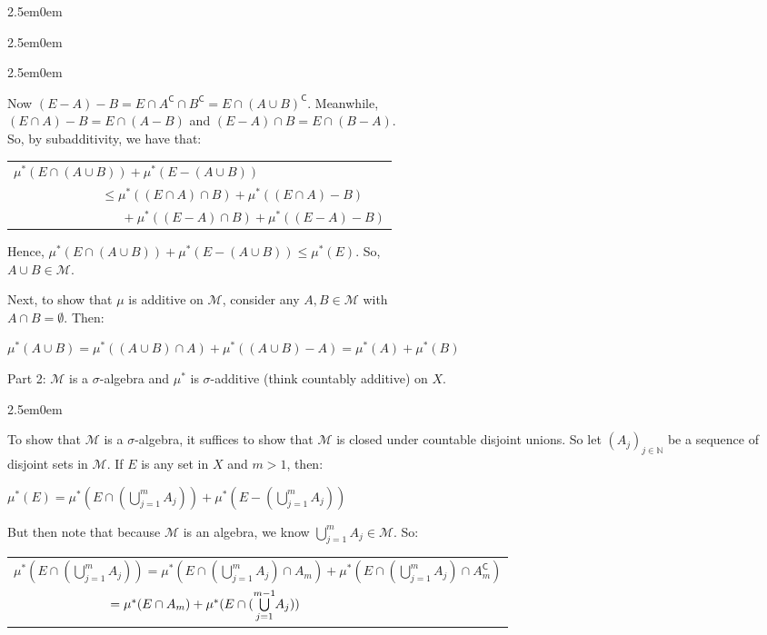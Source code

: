 \documentclass{book}
\newcommand{\hFour}{%
   \color{Cyan!80!black}
   \fontsize{12}{14}\selectfont%
}
\newenvironment{myIndent}{%
   \begin{adjustwidth}{2.5em}{0em}%
}{%
   \end{adjustwidth}%
}
\newcommand{\comp}{\mathsf{C}}
\newcommand{\retTwo}{\hfill\bigbreak}
\begin{document}
\begin{myIndent}
\begin{myIndent}
\begin{myIndent}
\begin{itemize}
            Now $(E - A) - B = E \cap A^\comp \cap B^\comp = E \cap (A \cup B)^\comp$. Meanwhile,\\ $(E \cap A) - B = E \cap (A - B)$ and $(E - A) \cap B = E \cap (B - A)$.\\ So, by subadditivity, we have that:

            {\centering\begin{tabular}{l}
               $\mu^*(E \cap (A \cup B)) + \mu^*(E - (A \cup B))$\\
               $\phantom{aaaaaaaaaaaaa} \leq \mu^*((E \cap A) \cap B) + \mu^*((E \cap A) - B)$\\ $\phantom{aaaaaaaaaaaaaaaa} + \mu^*((E - A) \cap B) + \mu^*((E - A) - B)$
            \end{tabular} \retTwo\par}

            Hence, $\mu^*(E \cap (A \cup B)) + \mu^*(E - (A \cup B)) \leq \mu^*(E)$. So,\\ $A \cup B \in \mathcal{M}$.\retTwo
         \end{itemize}

         Next, to show that $\mu$ is additive on $\mathcal{M}$, consider any $A, B \in \mathcal{M}$ with\\ $A \cap B = \emptyset$. Then:

         {\centering\fontsize{11}{13}\selectfont $\mu^*(A \cup B) = \mu^*((A \cup B) \cap A) + \mu^*((A \cup B) - A) = \mu^*(A) + \mu^*(B) $ \retTwo\par}
      \end{myIndent}

      Part 2: $\mathcal{M}$ is a $\sigma$-algebra and $\mu^*$ is $\sigma$-additive (think countably additive) on $X$.

      \begin{myIndent}\hFour
         To show that $\mathcal{M}$ is a $\sigma$-algebra, it suffices to show that $\mathcal{M}$ is closed under countable disjoint unions. So let $(A_j)_{j \in \mathbb{N}}$ be a sequence of disjoint sets in $\mathcal{M}$. If $E$ is any set in $X$ and $m > 1$, then:

         {\centering $\mu^*(E) = \mu^*(E \cap (\bigcup\limits_{j=1}^mA_j)) + \mu^*(E - (\bigcup\limits_{j=1}^mA_j))$  \retTwo\par}

         But then note that because $\mathcal{M}$ is an algebra, we know $\bigcup\limits_{j=1}^mA_j \in \mathcal{M}$. So:
         
         {\centering\fontsize{11.5}{13.5}\selectfont 
         \begin{tabular}{l}
            $\mu^*(E \cap (\bigcup\limits_{j=1}^mA_j)) = \mu^*(E \cap (\bigcup\limits_{j=1}^mA_j) \cap A_m) + \mu^*(E \cap (\bigcup\limits_{j=1}^mA_j) \cap A_m^\comp)$ \\ [-2pt]
            $\phantom{\mu^*(E \cap (\bigcup\limits_{j=1}^mA_j))} = \mu^*(E \cap A_m) + \mu^*(E \cap (\bigcup\limits_{j = 1}^{m-1}\hspace{-0.2em} A_j))$
         \end{tabular} \retTwo\par}


\end{myIndent}
\end{myIndent}
\end{myIndent}
\end{document}
